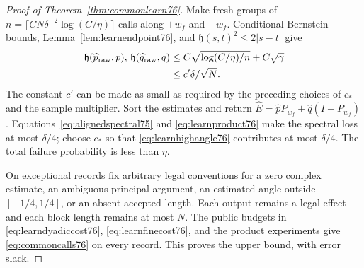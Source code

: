 \begin{proof}[Proof of Theorem~\ref{thm:commonlearn76}]
Make fresh groups of $n=\lceil CN\delta^{-2}\log(C/\eta)\rceil$
calls along $+w_f$ and $-w_f$.  Conditional Bernstein bounds,
Lemma~\ref{lem:learnendpoint76}, and
$\mathfrak h(s,t)^2\le2|s-t|$ give
\begin{align}
 \mathfrak h(\widehat p_{\rm raw},p),\,
 \mathfrak h(\widehat q_{\rm raw},q)
 &\le C\sqrt{\log(C/\eta)/n}+C\sqrt\gamma\notag\\
 &\le c'\delta/\sqrt N.
                                      \label{eq:learnhighend76}
\end{align}
The constant $c'$ can be made as small as required by the preceding
choices of $c_*$ and the sample multiplier.  Sort the estimates and
return $\widehat E=\widehat pP_{w_f}+\widehat q(I-P_{w_f})$.
Equations~\eqref{eq:alignedspectral75} and
\eqref{eq:learnproduct76} make the spectral loss at most
$\delta/4$; choose $c_*$ so that
\eqref{eq:learnhighangle76} contributes at most $\delta/4$.
The total failure probability is less than $\eta$.

On exceptional records fix arbitrary legal conventions for a zero
complex estimate, an ambiguous principal argument, an estimated
angle outside $[-1/4,1/4]$, or an absent accepted length.  Each
output remains a legal effect and each block
length remains at most $N$.  The public budgets in
\eqref{eq:learndyadiccost76}, \eqref{eq:learnfinecost76}, and the
product experiments give \eqref{eq:commoncalls76} on every record.
This proves the upper bound, with error slack.


\end{proof}
